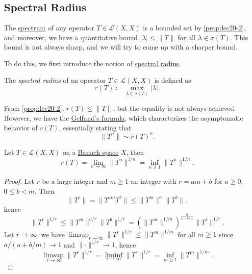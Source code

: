 \subsection{Spectral Radius}
The \hyperref[def:spectrum-point]{spectrum} of any operator \(T\in \mathcal{L} (X, X)\) is a bounded set by \autoref{prop:lec20-2}, and moreover, we have a quantitative bound \(\vert \lambda  \vert \leq \lVert T \rVert  \) for all \(\lambda \in \sigma (T)\). This bound is not always sharp, and we will try to come up with a sharper bound.

To do this, we first introduce the notion of \hyperref[def:spectral-radius]{spectral radius}.

\begin{definition}\label{def:spectral-radius}
	The \emph{spectral radius} of an operator \(T\in \mathcal{L} (X, X)\) is defined as
	\[
		r(T) \coloneqq \max _{\lambda\in \sigma (T) }\vert \lambda \vert .
	\]
\end{definition}

From \autoref{prop:lec20-2}, \(r(T) \leq \lVert T \rVert \), but the equality is not always achieved. However, we have the \hyperref[thm:Gelfand-formula]{Gelfand's formula}, which characterizes the asymptomatic behavior of \(r(T)\), essentially stating that
\[
	\lVert T^n \rVert \sim r(T)^n.
\]

\begin{theorem}\label{thm:Gelfand-formula}
	Let \(T\in \mathcal{L} (X, X)\) on a \hyperref[def:Banach-space]{Banach space} \(X\), then
	\[
		r(T) = \lim_{n \to \infty} \lVert T^n \rVert ^{1 / n} = \inf _{n\geq 1}\lVert T^n \rVert ^{1 / n}.
	\]
\end{theorem}
\begin{proof}\let\qed\relax
	Let \(r\) be a large integer and \(m\geq 1\) an integer with \(r = am+b\) for \(a \geq 0\), \(0 \leq b < m\). Then
	\[
		\lVert T^r \rVert
		= \lVert T^{am} T^b\rVert
		\leq \lVert T^m \rVert ^a \lVert T^b \rVert,
	\]
	hence
	\[
		\lVert T^r \rVert ^{1 / r}
		\leq \lVert T^m \rVert ^{a / r} \lVert T^b \rVert ^{1 / r}
		= \left( \lVert T^m \rVert ^{1 / m} \right) ^{\frac{a}{a+ b / m}} \lVert T^b \rVert ^{1 / r}.
	\]
	Let \(r \to \infty \), we have \(\limsup_{r \to \infty} \lVert T^r \rVert ^{1 / r} \leq \lVert T^m \rVert ^{1 / m}\) for all \(m \geq 1\) since \(a / (a + b / m) \to 1\) and \(\lVert \cdot \rVert ^{1 / r} \to 1\), hence
	\[
		\limsup_{r \to \infty} \lVert T^r \rVert ^{1 / r}
		= \liminf_{r \to \infty} \lVert T^r \rVert ^{1 / r}
		= \inf _{m\geq 1}\lVert T^m \rVert ^{1 / m}.
	\]
\end{proof}